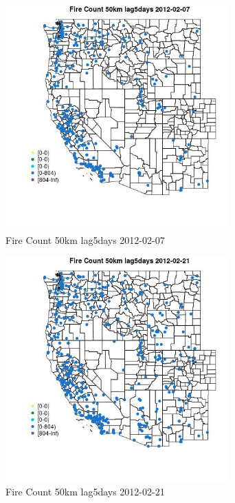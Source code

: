 \begin{figure} 
\centering  
\includegraphics[width=0.77\textwidth]{Code_Outputs/Report_ML_input_PM25_Step4_part_f_de_duplicated_aves_prioritize_24hr_obswNAs_MapObsFire_Count_50km_lag5days2012-02-07.jpg} 
\caption{\label{fig:Report_ML_input_PM25_Step4_part_f_de_duplicated_aves_prioritize_24hr_obswNAsMapObsFire_Count_50km_lag5days2012-02-07}Fire Count 50km lag5days 2012-02-07} 
\end{figure} 
 

\begin{figure} 
\centering  
\includegraphics[width=0.77\textwidth]{Code_Outputs/Report_ML_input_PM25_Step4_part_f_de_duplicated_aves_prioritize_24hr_obswNAs_MapObsFire_Count_50km_lag5days2012-02-21.jpg} 
\caption{\label{fig:Report_ML_input_PM25_Step4_part_f_de_duplicated_aves_prioritize_24hr_obswNAsMapObsFire_Count_50km_lag5days2012-02-21}Fire Count 50km lag5days 2012-02-21} 
\end{figure} 
 

